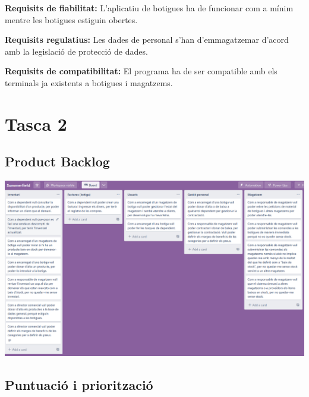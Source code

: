 \documentclass[a4paper,12pt]{article}
\begin{document}
\textbf{Requisits de fiabilitat:} L'aplicatiu de botigues ha de funcionar com a mínim mentre les botigues estiguin obertes.

\textbf{Requisits regulatius:} Les dades de personal s'han d'emmagatzemar d'acord amb la legislació de protecció de dades.

\textbf{Requisits de compatibilitat:} El programa ha de ser compatible amb els terminals ja existents a botigues i magatzems.

\section{Tasca 2}
\subsection{Product Backlog}
\includegraphics[width=\textwidth]{imatges/stories_trello.png}

\subsection{Puntuació i priorització}
\end{document}

